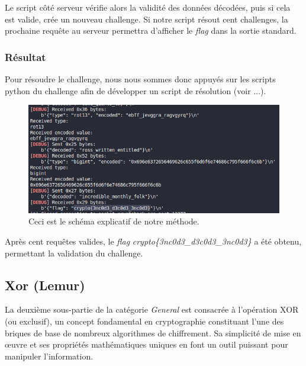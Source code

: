 \documentclass[12pt, a4paper]{article}
\begin{document}
            Le script côté serveur vérifie alors la validité des données décodées, puis si cela est valide, crée un nouveau challenge. Si notre script résout cent challenges, la prochaine requête au serveur permettra d'afficher le \textit{flag} dans la sortie standard.
            

        \subsubsection{Résultat}
            Pour résoudre le challenge, nous nous sommes donc appuyés sur les scripts python du challenge afin de développer un script de résolution (voir ...).

            \begin{figure}[H]
                \centering
                \includegraphics[width=0.8\linewidth]{Images/Encode/encode_chall_result.png}
                
                \caption{Ceci est le schéma explicatif de notre méthode.}
                
                \label{fig:encodeChallRes}
            \end{figure}

            Après cent requêtes valides, le \textit{flag} \textit{crypto\{3nc0d3\_d3c0d3\_3nc0d3\}} a été obtenu, permettant la validation du challenge.
            
    \subsection{Xor (Lemur)}
            La deuxième sous-partie de la catégorie \textit{General} est consacrée à 
        l'opération XOR (ou exclusif), un concept fondamental en cryptographie 
        constituant l'une des briques de base de nombreux algorithmes de chiffrement. 
        Sa simplicité de mise en œuvre et ses propriétés mathématiques uniques en font 
        un outil puissant pour manipuler l'information.
        
\end{document}
